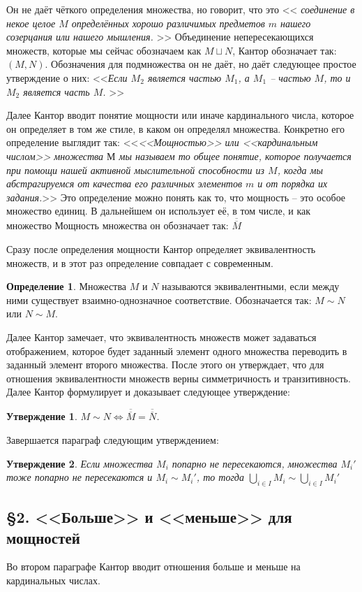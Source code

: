 \documentclass[a4paper,12pt]{extarticle}
\newtheorem{utv}{Утверждение}
\theoremstyle{definition}
\newtheorem{definition}{Определение}
\newcommand{\cit}[1]{<<\textit{#1}>>}
\newcommand{\car}[1]{\overline{\overline{#1}}}
\begin{document}
Он не даёт чёткого определения множества, но говорит, что это \cit{
соединение в некое целое $M$ определённых хорошо различимых предметов $m$ нашего созерцания или нашего мышления.
}
Объединение непересекающихся множеств, которые мы сейчас обозначаем как $M \sqcup N$, Кантор обозначает так: $(M, N)$.
Обозначения для подмножества он не даёт, но даёт следующее простое утверждение о них:
\cit{Если $M_2$ является частью $M_1$, а $M_1$ -- частью $M$, то и $M_2$ является часть $M$.
}

Далее Кантор вводит понятие мощности или иначе кардинального числа, которое он определяет в том же стиле, в каком он определял множества.
Конкретно его определение выглядит так:
\cit{<<Мощностью>> или <<кардинальным числом>> множества $М$ мы называем то общее понятие,
которое получается при помощи нашей активной мыслительной способности из $M$,
когда мы абстрагируемся от качества его различных элементов $m$ и от порядка их задания.}
Это определение можно понять как то, что мощность -- это особое множество единиц.
В дальнейшем он использует её, в том числе, и как множество
Мощность множества он обозначает так: $\car{M}$

Сразу после определения мощности Кантор определяет эквивалентность множеств, и в этот раз определение совпадает с современным.
\begin{definition}
Множества $M$ и $N$ называются эквивалентными, если между ними существует взаимно-однозначное соответствие. Обозначается так: $M \sim N$ или $N \sim M$.
\end{definition}

Далее Кантор замечает, что эквивалентность множеств может задаваться отображением, которое будет заданный элемент одного множества переводить в заданный элемент второго множества.
После этого он утверждает, что для отношения эквивалентности множеств верны симметричность и транзитивность.
Далее Кантор формулирует и доказывает следующее утверждение:
\begin{utv}
\label{simeq}
    $M \sim N \iff \car{M} = \car{N}$.
\end{utv}
Завершается параграф следующим утверждением:
\begin{utv}
\label{manysim}
Если множества $M_i$ попарно не пересекаются, множества $M_i'$ тоже попарно не пересекаются и $M_i \sim M_i'$, то тогда $\bigcup\limits_{i \in I} M_i \sim \bigcup\limits_{i \in I} M_i'$
\end{utv}

\subsection{\S 2. <<Больше>> и <<меньше>> для мощностей}
Во втором параграфе Кантор вводит отношения больше и меньше на кардинальных числах.
\end{document}
